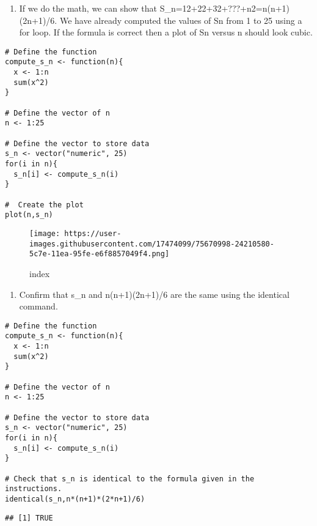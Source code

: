 \documentclass[]{article}
\providecommand{\tightlist}{%
  \setlength{\itemsep}{0pt}\setlength{\parskip}{0pt}}
\begin{document}
\begin{enumerate}
\def\labelenumi{\arabic{enumi}.}
\setcounter{enumi}{8}
\tightlist
\item
  If we do the math, we can show that
  S\_n=12+22+32+???+n2=n(n+1)(2n+1)/6. We have already computed the
  values of Sn from 1 to 25 using a for loop. If the formula is correct
  then a plot of Sn versus n should look cubic.
\end{enumerate}

\begin{verbatim}
# Define the function
compute_s_n <- function(n){
  x <- 1:n
  sum(x^2)
}

# Define the vector of n
n <- 1:25

# Define the vector to store data
s_n <- vector("numeric", 25)
for(i in n){
  s_n[i] <- compute_s_n(i)
}

#  Create the plot 
plot(n,s_n)
\end{verbatim}

\begin{figure}
\centering
\texttt{[image: https://user-images.githubusercontent.com/17474099/75670998-24210580-5c7e-11ea-95fe-e6f8857049f4.png]}
\caption{index}
\end{figure}

\begin{enumerate}
\def\labelenumi{\arabic{enumi}.}
\setcounter{enumi}{9}
\tightlist
\item
  Confirm that s\_n and n(n+1)(2n+1)/6 are the same using the identical
  command.
\end{enumerate}

\begin{verbatim}
# Define the function
compute_s_n <- function(n){
  x <- 1:n
  sum(x^2)
}

# Define the vector of n
n <- 1:25

# Define the vector to store data
s_n <- vector("numeric", 25)
for(i in n){
  s_n[i] <- compute_s_n(i)
}

# Check that s_n is identical to the formula given in the instructions.
identical(s_n,n*(n+1)*(2*n+1)/6)
\end{verbatim}

\begin{verbatim}
## [1] TRUE
\end{verbatim}
\end{document}
